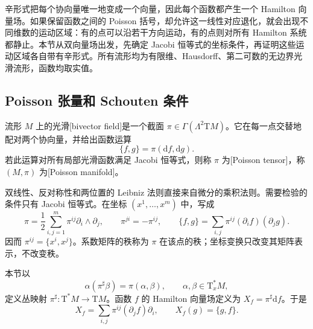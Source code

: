 
% 
% 
% 


辛形式把每个协向量唯一地变成一个向量，因此每个函数都产生一个 Hamilton 向量场。如果保留函数之间的 Poisson 括号，却允许这一线性对应退化，就会出现不同维数的运动区域：有的点可以沿若干方向运动，有的点则对所有 Hamilton 系统都静止。本节从双向量场出发，先确定 Jacobi 恒等式的坐标条件，再证明这些运动区域各自带有辛形式。所有流形均为有限维、Hausdorff、第二可数的无边界光滑流形，函数均取实值。

\subsection{Poisson 张量和 Schouten 条件}
\label{g4:subsec:0904:01}
\begin{definition}\label{g4:def:0904:poisson-tensor}
	流形 \(M\) 上的光滑[bivector field]是一个截面 \(\pi\in\Gamma(\Lambda^2\mathrm{T}M)\)。它在每一点交替地配对两个协向量，并给出函数运算
	\begin{equation}\label{g4:eq:0904:bracket-tensor}
		\{f,g\}=\pi(\mathrm{d}f,\mathrm{d}g).
	\end{equation}
	若此运算对所有局部光滑函数满足 Jacobi 恒等式，则称 \(\pi\) 为[Poisson tensor]，称 \((M,\pi)\) 为[Poisson manifold]。
\end{definition}

双线性、反对称性和两位置的 Leibniz 法则直接来自微分的乘积法则。需要检验的条件只有 Jacobi 恒等式。在坐标 \((x^1,\ldots,x^m)\) 中，写成
\begin{equation}\label{g4:eq:0904:coordinate-tensor}
	\pi=\frac12\sum_{i,j=1}^m\pi^{ij}\partial_i\wedge\partial_j,
	\qquad \pi^{ji}=-\pi^{ij},
	\qquad \{f,g\}=\sum_{i,j}\pi^{ij}(\partial_i f)(\partial_j g).
\end{equation}
因而 \(\pi^{ij}=\{x^i,x^j\}\)。系数矩阵的秩称为 \(\pi\) 在该点的秩；坐标变换只改变其矩阵表示，不改变秩。

\begin{definition}\label{g4:def:0904:sharp}
	本节以
	\begin{equation}\label{g4:eq:0904:sharp-convention}
		\alpha(\pi^\sharp\beta)=\pi(\alpha,\beta),
		\qquad \alpha,\beta\in\mathrm{T}_x^*M,
	\end{equation}
	定义丛映射 \(\pi^\sharp:\mathrm{T}^*M\to\mathrm{T}M\)。函数 \(f\) 的 Hamilton 向量场定义为 \(X_f=\pi^\sharp\mathrm{d}f\)。于是
	\begin{equation}\label{g4:eq:0904:hamiltonian-coordinate}
		X_f=\sum_{i,j}\pi^{ij}(\partial_j f)\partial_i,
		\qquad X_f(g)=\{g,f\}.
	\end{equation}
\end{definition}

